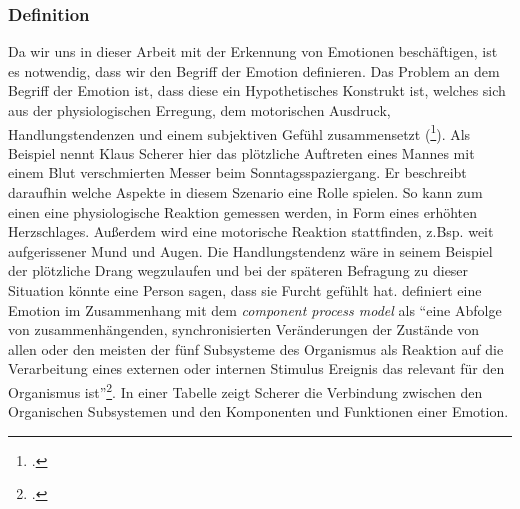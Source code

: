 \subsubsection{Definition}
Da wir uns in dieser Arbeit mit der Erkennung von Emotionen beschäftigen, ist es notwendig, dass wir den Begriff der Emotion definieren. Das Problem an dem Begriff der Emotion ist, dass diese ein Hypothetisches Konstrukt ist, welches sich aus der physiologischen Erregung, dem motorischen Ausdruck, Handlungstendenzen und einem subjektiven Gefühl zusammensetzt (\footcite[Vgl.][S.166 Abschnitt Emotion]{Kla02}).\newline
Als Beispiel nennt Klaus Scherer hier das plötzliche Auftreten eines Mannes mit einem Blut verschmierten Messer beim Sonntagsspaziergang. Er beschreibt daraufhin welche Aspekte in diesem Szenario eine Rolle spielen. So kann zum einen eine physiologische Reaktion gemessen werden, in Form eines erhöhten Herzschlages. Außerdem wird eine motorische Reaktion stattfinden, z.Bsp. weit aufgerissener Mund und Augen. Die Handlungstendenz wäre in seinem Beispiel der plötzliche Drang wegzulaufen und bei der späteren Befragung zu dieser Situation könnte eine Person sagen, dass sie Furcht gefühlt hat.\newline
\cite{Kla05} definiert eine Emotion im Zusammenhang mit dem \textit{component process model} als ``eine Abfolge von zusammenhängenden, synchronisierten Veränderungen der Zustände von allen oder den meisten der fünf Subsysteme des Organismus als Reaktion auf die Verarbeitung eines externen oder internen Stimulus Ereignis das relevant für den Organismus ist''\footcite[Übersetzt aus ][S.697 Z.32ff]{Kla05}. In einer Tabelle zeigt Scherer die Verbindung zwischen den Organischen Subsystemen und den Komponenten und Funktionen einer Emotion. 
